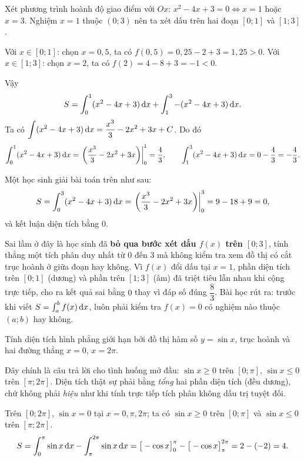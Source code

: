 \begin{loigiai}
Xét phương trình hoành độ giao điểm với $Ox$: $x^2-4x+3=0 \Leftrightarrow x=1$ hoặc $x=3$. Nghiệm $x=1$ thuộc $(0;3)$ nên ta xét dấu trên hai đoạn $[0;1]$ và $[1;3]$.

Với $x\in[0;1]$: chọn $x=0,5$, ta có $f(0{,}5)=0{,}25-2+3=1{,}25>0$.
Với $x\in[1;3]$: chọn $x=2$, ta có $f(2)=4-8+3=-1<0$.

Vậy
\[
S=\int_0^1 (x^2-4x+3)\,\mathrm{d}x + \int_1^3 -(x^2-4x+3)\,\mathrm{d}x.
\]
Ta có $\displaystyle\int (x^2-4x+3)\,\mathrm{d}x = \frac{x^3}{3}-2x^2+3x+C$. Do đó
\[
\int_0^1(x^2-4x+3)\,\mathrm{d}x = \left.\left(\frac{x^3}{3}-2x^2+3x\right)\right|_0^1 = \frac{4}{3},
\qquad
\int_1^3(x^2-4x+3)\,\mathrm{d}x = 0-\frac{4}{3}=-\frac{4}{3}.
\]
\end{loigiai}

\begin{hopsailam}
Một học sinh giải bài toán trên như sau:
\[
S=\int_0^3(x^2-4x+3)\,\mathrm{d}x = \left.\left(\frac{x^3}{3}-2x^2+3x\right)\right|_0^3 = 9-18+9=0,
\]
và kết luận diện tích bằng $0$.

Sai lầm ở đây là học sinh đã \textbf{bỏ qua bước xét dấu $f(x)$ trên $[0;3]$}, tính thẳng một tích phân duy nhất từ $0$ đến $3$ mà không kiểm tra xem đồ thị có cắt trục hoành ở giữa đoạn hay không. Vì $f(x)$ đổi dấu tại $x=1$, phần diện tích trên $[0;1]$ (dương) và phần trên $[1;3]$ (âm) đã triệt tiêu lẫn nhau khi cộng trực tiếp, cho ra kết quả sai bằng $0$ thay vì đáp số đúng $\dfrac83$. Bài học rút ra: trước khi viết $S=\int_a^b f(x)\,\mathrm{d}x$, luôn phải kiểm tra $f(x)=0$ có nghiệm nào thuộc $(a;b)$ hay không.
\end{hopsailam}

\begin{hopvidu}
Tính diện tích hình phẳng giới hạn bởi đồ thị hàm số $y=\sin x$, trục hoành và hai đường thẳng $x=0$, $x=2\pi$.
\end{hopvidu}

\begin{hopyduong}
Đây chính là câu trả lời cho tình huống mở đầu: $\sin x\ge0$ trên $[0;\pi]$, $\sin x\le0$ trên $[\pi;2\pi]$. Diện tích thật sự phải bằng \emph{tổng} hai phần diện tích (đều dương), chứ không phải \emph{hiệu} như khi tính trực tiếp tích phân không dấu trị tuyệt đối.
\end{hopyduong}

\begin{loigiai}
Trên $[0;2\pi]$, $\sin x=0$ tại $x=0,\pi,2\pi$; ta có $\sin x\ge0$ trên $[0;\pi]$ và $\sin x\le 0$ trên $[\pi;2\pi]$.
\[
S=\int_0^\pi \sin x\,\mathrm{d}x - \int_\pi^{2\pi}\sin x\,\mathrm{d}x = \big[-\cos x\big]_0^\pi - \big[-\cos x\big]_\pi^{2\pi} = 2-(-2)=4.
\]
\end{loigiai}

